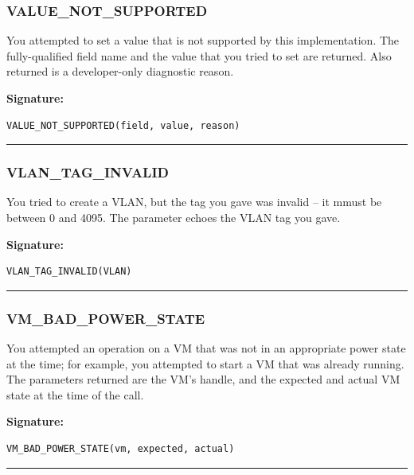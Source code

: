 \subsubsection{VALUE\_NOT\_SUPPORTED}

You attempted to set a value that is not supported by this implementation. 
The fully-qualified field name and the value that you tried to set are
returned.  Also returned is a developer-only diagnostic reason.

\vspace{0.3cm}
{\bf Signature:}
\begin{verbatim}VALUE_NOT_SUPPORTED(field, value, reason)\end{verbatim}
\begin{center}\rule{10em}{0.1pt}\end{center}

\subsubsection{VLAN\_TAG\_INVALID}

You tried to create a VLAN, but the tag you gave was invalid -- it mmust be
between 0 and 4095.  The parameter echoes the VLAN tag you gave.

\vspace{0.3cm}
{\bf Signature:}
\begin{verbatim}VLAN_TAG_INVALID(VLAN)\end{verbatim}
\begin{center}\rule{10em}{0.1pt}\end{center}

\subsubsection{VM\_BAD\_POWER\_STATE}

You attempted an operation on a VM that was not in an appropriate power
state at the time; for example, you attempted to start a VM that was
already running.  The parameters returned are the VM's handle, and the
expected and actual VM state at the time of the call.

\vspace{0.3cm}
{\bf Signature:}
\begin{verbatim}VM_BAD_POWER_STATE(vm, expected, actual)\end{verbatim}
\begin{center}\rule{10em}{0.1pt}\end{center}



